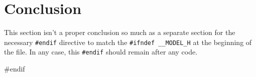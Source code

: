 \documentclass{article}
\begin{document}
  \section{Conclusion}

    This section isn't a proper conclusion so much as a separate section for the
    necessary \verb|#endif| directive to match the \verb|#ifndef __MODEL_H| at the beginning
    of the file. In any case, this \verb|#endif| should remain after any code.

\begin{ccode}
#endif
\end{ccode}
\end{document}
